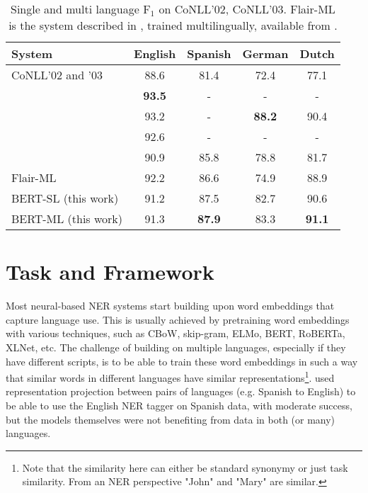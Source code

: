 \documentclass[letterpaper]{article} \usepackage{aaai20}  \usepackage{times}  \usepackage{helvet} \usepackage{courier}  \usepackage[hyphens]{url}  \usepackage{graphicx} \urlstyle{rm} \def\UrlFont{\rm}  \usepackage{graphicx}  \frenchspacing  \setlength{\pdfpagewidth}{8.5in}  \setlength{\pdfpageheight}{11in}  \usepackage{amsmath}
\newcommand{\citet}[1]{\citeauthor{#1} \shortcite{#1}}
\providecommand{\tabularnewline}{\\}
\begin{document}
\begin{table}[ht!]
\setlength\tabcolsep{2pt} \begin{tabular}{|p{4cm}|c|c|c|c|}
\hline 
{\small{}{System}} & {\small{}{English}} & {\small{}{Spanish}} & {\small{}{German}} & {\small{}{Dutch}}\tabularnewline
\hline 
{\small{}CoNLL'02 and '03} & {\small{}{88.6}} & {\small{}{81.4}} & {\small{}{72.4}} & {\small{}{77.1}}\tabularnewline
\hline 
{\small{}\citet{Baevski19-cloze5}} & {\small{}\textbf{93.5}} & {\small{}{-}} & {\small{}{-}} & {\small{}{-}}\tabularnewline
\hline 
{\small{}\citet{akbik-etal-2018-contextual}} & {\small{}{93.2}} & {\small{}{-}} & {\small{}\textbf{88.2}} & {\small{}{90.4}}\tabularnewline
\hline 
{\small{}\citet{BERT18}} & {\small{}{92.6}} & {\small{}{-}} & {\small{}{-}} & {\small{}{-}}\tabularnewline
\hline 
{\small{}\citet{LampleBSKD16}} & {\small{}{90.9}} & {\small{}{85.8}} & {\small{}{78.8}} & {\small{}{81.7}}\tabularnewline
\hline 
{\small{}Flair-ML} & {\small{}{92.2}} & {\small{}{86.6}} & {\small{}{74.9}} & {\small{}{88.9}}\tabularnewline
\hline \hline
{\small{}{BERT-SL (this work)}} & {\small{}{91.2}} & {\small{}87.5} & {\small{}82.7} & {\small{}{90.6}}\tabularnewline
\hline 
{\small{}{BERT-ML (this work)}} & {\small{}{91.3}} & {\small{}\textbf{87.9}} & {\small{}{83.3}} & {\small{}\textbf{91.1}} \tabularnewline
\hline 
\end{tabular}{\small{}{\small{}\vspace*{2mm}}}


{\small{}\caption{Single and multi language F$_{1}$ on CoNLL'02, CoNLL'03. Flair-ML is the system described in \cite{akbik-etal-2018-contextual}, trained multilingually, available from \cite{akbik19:flair}\label{table:Multitrain}.}
}{\small\par}
\end{table}
 \section{Task and Framework}
Most neural-based NER systems start building upon word embeddings that capture language use. This is usually
achieved by pretraining word embeddings with various techniques, such as
CBoW, skip-gram, ELMo, BERT, RoBERTa, XLNet, etc. The challenge of building on multiple languages, especially if they have different scripts, is to be able to
train these word embeddings in such a way that similar words in different
languages have similar representations\footnote{Note that the
  similarity here can either be standard synonymy or just task
  similarity. From an NER perspective "John" and "Mary" are
  similar.}. \citet{ni-etal-2017-weakly} used representation projection
between pairs of languages (e.g. Spanish to English) to be able to use
the English NER tagger on Spanish data, with moderate success, but the
models themselves were not benefiting from data in both (or many)
languages.
\end{document}
